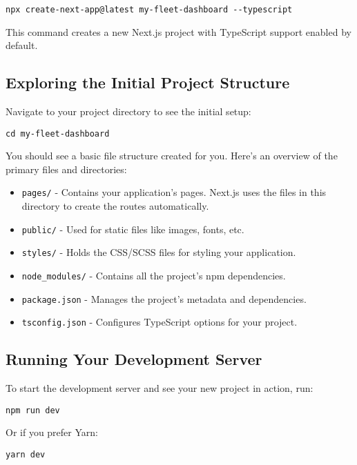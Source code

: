 \begin{verbatim}
npx create-next-app@latest my-fleet-dashboard --typescript
\end{verbatim}

This command creates a new Next.js project with TypeScript support enabled by default.

\subsection*{Exploring the Initial Project Structure}
Navigate to your project directory to see the initial setup:

\begin{verbatim}
cd my-fleet-dashboard
\end{verbatim}

You should see a basic file structure created for you. Here's an overview of the primary files and directories:

\begin{itemize}
    \item \texttt{pages/} - Contains your application's pages. Next.js uses the files in this directory to create the routes automatically.
    \item \texttt{public/} - Used for static files like images, fonts, etc.
    \item \texttt{styles/} - Holds the CSS/SCSS files for styling your application.
    \item \texttt{node\_modules/} - Contains all the project's npm dependencies.
    \item \texttt{package.json} - Manages the project's metadata and dependencies.
    \item \texttt{tsconfig.json} - Configures TypeScript options for your project.
\end{itemize}

\subsection*{Running Your Development Server}
To start the development server and see your new project in action, run:

\begin{verbatim}
npm run dev
\end{verbatim}

Or if you prefer Yarn:

\begin{verbatim}
yarn dev
\end{verbatim}

